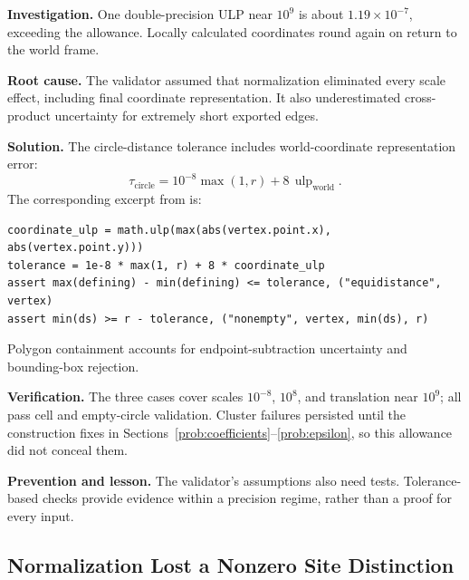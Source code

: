 \textbf{Investigation.} One double-precision ULP near \(10^9\) is about \(1.19\times10^{-7}\), exceeding the allowance. Locally calculated coordinates round again on return to the world frame.

\textbf{Root cause.} The validator assumed that normalization eliminated every scale effect, including final coordinate representation. It also underestimated cross-product uncertainty for extremely short exported edges.

\textbf{Solution.} The circle-distance tolerance includes world-coordinate representation error:
\begin{equation}
  \tau_{\mathrm{circle}}
  =10^{-8}\max(1,r)+8\,\operatorname{ulp}_{\mathrm{world}}.
  \label{eq:validation-tolerance}
\end{equation}
The corresponding excerpt from  is:

\noindent\begin{minipage}{\linewidth}
\begin{lstlisting}[caption={Account for output-coordinate spacing in empty-circle validation.},label={lst:validator-fix}]
coordinate_ulp = math.ulp(max(abs(vertex.point.x), abs(vertex.point.y)))
tolerance = 1e-8 * max(1, r) + 8 * coordinate_ulp
assert max(defining) - min(defining) <= tolerance, ("equidistance", vertex)
assert min(ds) >= r - tolerance, ("nonempty", vertex, min(ds), r)
\end{lstlisting}
\end{minipage}

Polygon containment accounts for endpoint-subtraction uncertainty and bounding-box rejection.

\textbf{Verification.} The three  cases cover scales \(10^{-8}\), \(10^8\), and translation near \(10^9\); all pass cell and empty-circle validation. Cluster failures persisted until the construction fixes in Sections~\ref{prob:coefficients}--\ref{prob:epsilon}, so this allowance did not conceal them.

\textbf{Prevention and lesson.} The validator's assumptions also need tests. Tolerance-based checks provide evidence within a precision regime, rather than a proof for every input.


\clearpage
\subsection{Normalization Lost a Nonzero Site Distinction}
\label{prob:normalization}

